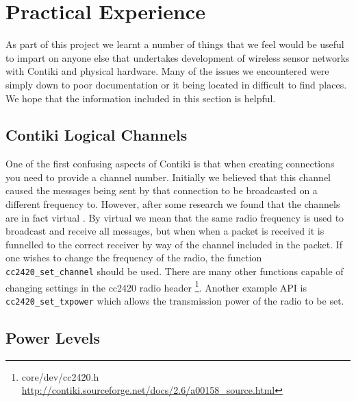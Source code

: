 \section{Practical Experience}

As part of this project we learnt a number of things that we feel would be useful to impart on anyone else that undertakes development of wireless sensor networks with Contiki and physical hardware. Many of the issues we encountered were simply down to poor documentation or it being located in difficult to find places. We hope that the information included in this section is helpful.

\subsection{Contiki Logical Channels}

One of the first confusing aspects of Contiki is that when creating connections you need to provide a channel number. Initially we believed that this channel caused the messages being sent by that connection to be broadcasted on a different frequency to. However, after some research we found that the channels are in fact virtual \cite{Dunkels:2007:ACA:1322263.1322295,tel-aviv-contiki-exercises}. By virtual we mean that the same radio frequency is used to broadcast and receive all messages, but when when a packet is received it is funnelled to the correct receiver by way of the channel included in the packet. If one wishes to change the frequency of the radio, the function \verb|cc2420_set_channel| should be used. There are many other functions capable of changing settings in the cc2420 radio header \footnote{core/dev/cc2420.h \url{http://contiki.sourceforge.net/docs/2.6/a00158_source.html}}. Another example API is \verb|cc2420_set_txpower| which allows the transmission power of the radio to be set.

\subsection{Power Levels}

